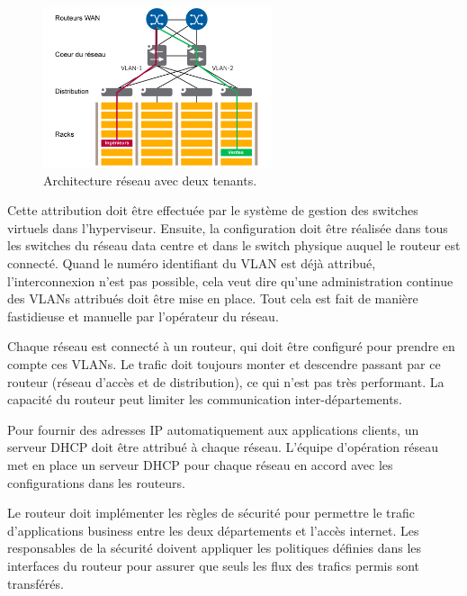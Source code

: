 \begin{figure}[h]
\begin{center}
\includegraphics[width=0.6\textwidth]{images/AspecMultiTenant_T} 
\caption{Architecture réseau avec deux tenants. \cite{leveragingSDNCloudNetworkServiceExample}} \label{AspecMultiTenant}
\end{center}
\end{figure} 

Cette attribution doit être effectuée par le système de gestion des switches virtuels dans l'hyperviseur. Ensuite, la configuration doit être réalisée dans tous les switches du réseau data centre et dans le switch physique auquel le routeur est connecté. Quand le numéro identifiant du VLAN est déjà attribué, l'interconnexion n'est pas possible, cela veut dire qu'une administration continue des VLANs attribués doit être mise en place. Tout cela est fait de manière fastidieuse et manuelle par l'opérateur du réseau.

Chaque réseau est connecté à un routeur, qui doit être configuré pour prendre en compte ces VLANs. Le trafic doit toujours monter et descendre passant par ce routeur (réseau d'accès et de distribution), ce qui n'est pas très performant. La capacité du routeur peut limiter les communication inter-départements. 

Pour fournir des adresses IP automatiquement aux applications clients, un serveur DHCP doit être attribué à chaque réseau. L'équipe d'opération réseau met en place un serveur DHCP pour chaque réseau en accord avec les configurations dans les routeurs.

Le routeur doit implémenter les règles de sécurité pour permettre le trafic d'applications business entre les deux départements et l'accès internet. Les responsables de la sécurité doivent appliquer les politiques définies dans les interfaces du routeur pour assurer que seuls les flux des trafics permis sont transférés.

